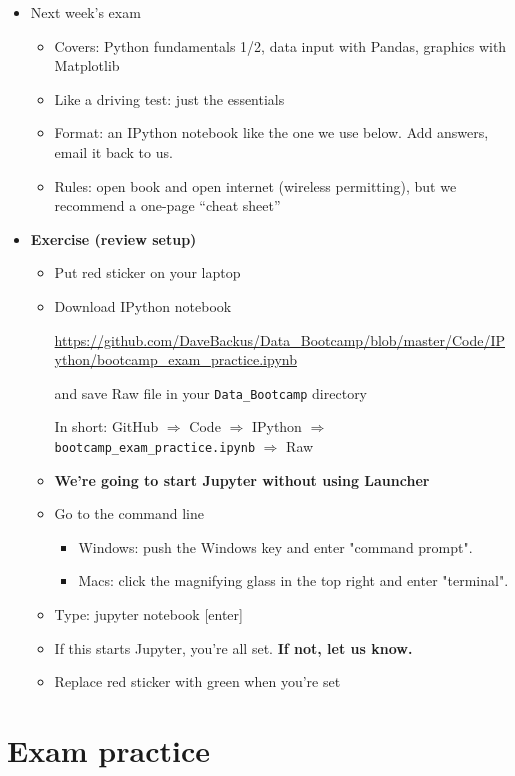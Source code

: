 \documentclass[11pt]{article}
\begin{document}
\begin{itemize}
\item Next week's exam
\begin{itemize}
\item Covers:  Python fundamentals 1/2, data input with Pandas, graphics with Matplotlib
\item Like a driving test:  just the essentials
\item Format:  an IPython notebook like the one we use below.  Add answers, email it back to us.
\item Rules:  open book and open internet (wireless permitting), but we recommend a one-page ``cheat sheet''
\end{itemize}

\item {\bf Exercise (review setup)} 
\begin{itemize}
\item Put red sticker on your laptop

\item Download IPython notebook

\url{https://github.com/DaveBackus/Data_Bootcamp/blob/master/Code/IPython/bootcamp_exam_practice.ipynb} %

and save Raw file in your \verb|Data_Bootcamp| directory 

In short:  GitHub $\Rightarrow$ Code $\Rightarrow$ IPython $\Rightarrow$ \verb|bootcamp_exam_practice.ipynb| 
$\Rightarrow$ Raw

\item {\bf We're going to start Jupyter without using Launcher} 
\item Go to the command line  
\begin{itemize}
\item Windows:  push the Windows key and enter "command prompt".  
\item Macs:  click the magnifying glass in the top right and enter "terminal".
\end{itemize} 
\item Type:  jupyter notebook [enter]
\item If this starts Jupyter, you're all set.  {\bf If not, let us know.}
\item Replace red sticker with green when you're set
\end{itemize}

\end{itemize}


\section*{Exam practice}
\end{document}
